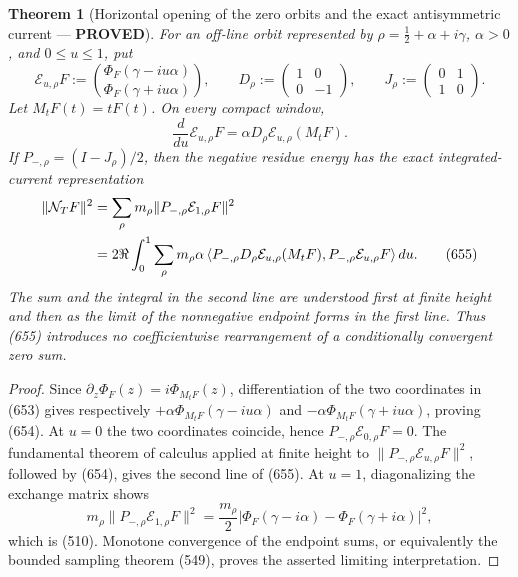 \documentclass[11pt]{article}
\newtheorem{theorem}{Theorem}
\newcommand{\PROVED}{\textcolor{green!45!black}{\textbf{PROVED}}}
\begin{document}
\begin{theorem}[Horizontal opening of the zero orbits and the exact
antisymmetric current --- \PROVED]
For an off-line orbit represented by
\(\rho=\frac12+\alpha+i\gamma\), \(\alpha>0\), and
\(0\le u\le1\), put
\begin{equation}
 \mathcal E_{u,\rho}F:=
 \binom{\Phi_F(\gamma-iu\alpha)}
       {\Phi_F(\gamma+iu\alpha)},\qquad
 D_\rho:=\begin{pmatrix}1&0\\0&-1\end{pmatrix},
 \qquad J_\rho:=\begin{pmatrix}0&1\\1&0\end{pmatrix}. \tag{653}
\end{equation}
Let \(M_tF(t)=tF(t)\).  On every compact window,
\begin{equation}
 \frac d{du}\mathcal E_{u,\rho}F
 =\alpha D_\rho\mathcal E_{u,\rho}(M_tF).            \tag{654}
\end{equation}
If \(P_{-,\rho}=(I-J_\rho)/2\), then the negative residue energy has the
exact integrated-current representation
\begin{align}
 \|\mathcal N_TF\|^2
 &=\sum_{\rho}m_\rho
   \|P_{-,\rho}\mathcal E_{1,\rho}F\|^2\notag\\
 &=2\Re\int_0^1\sum_{\rho}m_\rho\alpha
 \left\langle
 P_{-,\rho}D_\rho\mathcal E_{u,\rho}(M_tF),
 P_{-,\rho}\mathcal E_{u,\rho}F
 \right\rangle du .                                \tag{655}
\end{align}
The sum and the integral in the second line are understood first at finite
height and then as the limit of the nonnegative endpoint forms in the first
line.  Thus (655) introduces no coefficientwise rearrangement of a
conditionally convergent zero sum.
\end{theorem}

\begin{proof}
Since
\(\partial_z\Phi_F(z)=i\Phi_{M_tF}(z)\), differentiation of the two
coordinates in (653) gives respectively
\(+\alpha\Phi_{M_tF}(\gamma-iu\alpha)\) and
\(-\alpha\Phi_{M_tF}(\gamma+iu\alpha)\), proving (654).
At \(u=0\) the two coordinates coincide, hence
\(P_{-,\rho}\mathcal E_{0,\rho}F=0\).  The fundamental theorem of
calculus applied at finite height to
\(\|P_{-,\rho}\mathcal E_{u,\rho}F\|^2\), followed by (654), gives
the second line of (655).  At \(u=1\), diagonalizing the exchange matrix
shows
\[
 m_\rho\|P_{-,\rho}\mathcal E_{1,\rho}F\|^2
 =\frac{m_\rho}{2}
 |\Phi_F(\gamma-i\alpha)-\Phi_F(\gamma+i\alpha)|^2,
\]
which is (510).  Monotone convergence of the endpoint sums, or equivalently
the bounded sampling theorem (549), proves the asserted limiting
interpretation.
\end{proof}
\end{document}
